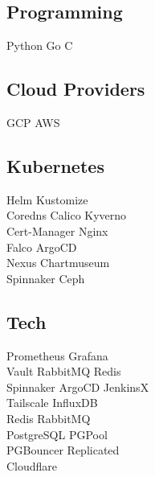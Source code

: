 \documentclass[]{config}
\begin{document}
\begin{minipage}[t]{0.33\textwidth}
\vspace{\topsep}
\subsection{Programming}
Python \textbullet{} Go \textbullet{} C

\vspace{\topsep}
\subsection{Cloud Providers}
GCP \textbullet{} AWS

\vspace{\topsep}
\subsection{Kubernetes}
Helm \textbullet{} Kustomize \\
Coredns \textbullet{} Calico \textbullet{} Kyverno \\
Cert-Manager \textbullet{} Nginx \\
Falco \textbullet{} ArgoCD \\
Nexus \textbullet{} Chartmuseum \\
Spinnaker \textbullet{} Ceph \\

\vspace{\topsep}
\subsection{Tech}
Prometheus \textbullet{} Grafana \\
Vault \textbullet{} RabbitMQ \textbullet{} Redis \\
Spinnaker \textbullet{} ArgoCD \textbullet{} JenkinsX \\
Tailscale \textbullet{} InfluxDB \\
Redis \textbullet{} RabbitMQ \\
PostgreSQL \textbullet{} PGPool \\
PGBouncer \textbullet{} Replicated \\
Cloudflare \\

%
%

\end{minipage}
\end{document}
